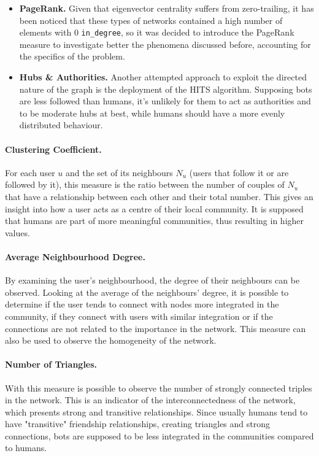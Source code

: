 \documentclass[12pt, a4paper]{article}
\begin{document}
\begin{itemize}
			\item \textbf{PageRank.} Given that eigenvector centrality suffers from zero-trailing, it has been noticed that these types of networks contained a high number of elements with 0 \texttt{in\_degree}, so it was decided to introduce the PageRank measure to investigate better the phenomena discussed before, accounting for the specifics of the problem.
			\item \textbf{Hubs \& Authorities.} Another attempted approach to exploit the directed nature of the graph is the deployment of the HITS algorithm. Supposing bots are less followed than humans, it's unlikely for them to act as authorities and to be moderate hubs at best, while humans should have a more evenly distributed behaviour.
		\end{itemize}
		\paragraph{Clustering Coefficient.} For each user $u$ and the set of its neighbours $N_{u}$ (users that follow it or are followed by it), this measure is the ratio between the number of couples of $N_{u}$ that have a relationship between each other and their total number. This gives an insight into how a user acts as a centre of their local community. It is supposed that humans are part of more meaningful communities, thus resulting in higher values.
		\paragraph{Average Neighbourhood Degree.} By examining the user's neighbourhood, the degree of their neighbours can be observed. Looking at the average of the neighbours' degree, it is possible to determine if the user tends to connect with nodes more integrated in the community, if they connect with users with similar integration or if the connections are not related to the importance in the network. This measure can also be used to observe the homogeneity of the network.
        \paragraph{Number of Triangles.} With this measure is possible to observe the number of strongly connected triples in the network. This is an indicator of the interconnectedness of the network, which presents strong and transitive relationships. Since usually humans tend to have "transitive" friendship relationships, creating triangles and strong connections, bots are supposed to be less integrated in the communities compared to humans.
\end{document}
